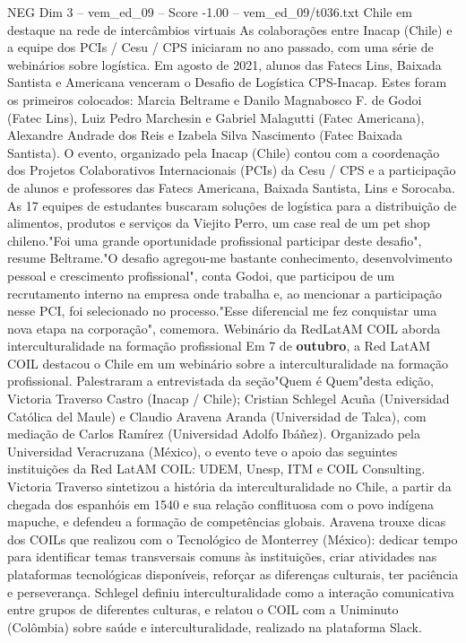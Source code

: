 \begin{textsample}{NEG Dim 3 – vem\_ed\_09 – Score -1.00 – vem\_ed\_09/t036.txt}  \label{ex:f3_neg_028}
Chile em destaque na rede de intercâmbios virtuais As colaborações entre Inacap (Chile) e a equipe dos PCIs / Cesu / CPS iniciaram no ano passado, com uma série de webinários sobre logística.
Em agosto de 2021, alunos das Fatecs Lins, Baixada Santista e Americana venceram o Desafio de Logística CPS-Inacap.
Estes foram os primeiros colocados: Marcia Beltrame e Danilo Magnabosco F. de Godoi (Fatec Lins), Luiz Pedro Marchesin e Gabriel Malagutti (Fatec Americana), Alexandre Andrade dos Reis e Izabela Silva Nascimento (Fatec Baixada Santista).
O evento, organizado pela Inacap (Chile) contou com a coordenação dos Projetos Colaborativos Internacionais (PCIs) da Cesu / CPS e a participação de alunos e professores das Fatecs Americana, Baixada Santista, Lins e Sorocaba.
As 17 equipes de estudantes buscaram soluções de logística para a distribuição de alimentos, produtos e serviços da Viejito Perro, um case real de um pet shop chileno."Foi uma grande oportunidade profissional participar deste desafio", resume Beltrame."O desafio agregou-me bastante conhecimento, desenvolvimento pessoal e crescimento profissional", conta Godoi, que participou de um recrutamento interno na empresa onde trabalha e, ao mencionar a participação nesse PCI, foi selecionado no processo."Esse diferencial me fez conquistar uma nova etapa na corporação", comemora.
Webinário da RedLatAM COIL aborda interculturalidade na formação profissional Em 7 de \textbf{outubro}, a Red LatAM COIL destacou o Chile em um webinário sobre a interculturalidade na formação profissional.
Palestraram a entrevistada da seção"Quem é Quem"desta edição, Victoria Traverso Castro (Inacap / Chile); Cristian Schlegel Acuña (Universidad Católica del Maule) e Claudio Aravena Aranda (Universidad de Talca), com mediação de Carlos Ramírez (Universidad Adolfo Ibáñez).
Organizado pela Universidad Veracruzana (México), o evento teve o apoio das seguintes instituições da Red LatAM COIL: UDEM, Unesp, ITM e COIL Consulting.
Victoria Traverso sintetizou a história da interculturalidade no Chile, a partir da chegada dos espanhóis em 1540 e sua relação conflituosa com o povo indígena mapuche, e defendeu a formação de competências globais.
Aravena trouxe dicas dos COILs que realizou com o Tecnológico de Monterrey (México): dedicar tempo para identificar temas transversais comuns às instituições, criar atividades nas plataformas tecnológicas disponíveis, reforçar as diferenças culturais, ter paciência e perseverança.
Schlegel definiu interculturalidade como a interação comunicativa entre grupos de diferentes culturas, e relatou o COIL com a Uniminuto (Colômbia) sobre saúde e interculturalidade, realizado na plataforma Slack.

\end{textsample}
